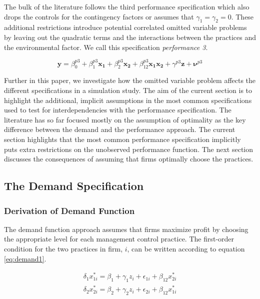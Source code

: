 \documentclass[12pt]{article}
\begin{document}
The bulk of the literature follows the third performance specification
which also drops the controls for the contingency factors or assumes
that \(\gamma_1 = \gamma_2 = 0\). These additional restrictions
introduce potential correlated omitted variable problems by leaving out
the quadratic terms and the interactions between the practices and the
environmental factor. We call this specification \emph{performance 3}.

\[
\mathbf{y} = \beta^{p3}_0 + \beta^{p3}_1 \mathbf{x_1} + \beta^{p3}_2 \mathbf{x_2}
  + \beta^{p3}_{12} \mathbf{x_1} \mathbf{x_2} + \gamma^{p3} \mathbf{z} +
  \mathbf{\nu}^{p3}
\]

Further in this paper, we investigate how the omitted variable problem
affects the different specifications in a simulation study. The aim of
the current section is to highlight the additional, implicit assumptions
in the most common specifications used to test for interdependencies
with the performance specification. The literature has so far focused
mostly on the assumption of optimality as the key difference between the
demand and the performance approach. The current section highlights that
the most common performance specification implicitly puts extra
restrictions on the unobserved performance function. The next section
discusses the consequences of assuming that firms optimally choose the
practices.

\subsection{The Demand Specification}\label{the-demand-specification}

\subsubsection{Derivation of Demand
Function}\label{derivation-of-demand-function}

The demand function approach assumes that firms maximize profit by
choosing the appropriate level for each management control practice. The
first-order condition for the two practices in firm, \(i\), can be
written according to equation \eqref{eq:demand1}.

\begin{align}\label{eq:demand1}
\delta_1 x^*_{1i} = \beta_1 + \gamma_1 z_i + \epsilon_{1i} + \beta_{12} x^*_{2i}
\\
\delta_2 x^*_{2i} = \beta_2 + \gamma_2 z_i + \epsilon_{2i} + \beta_{12} x^*_{1i}
\nonumber
\end{align}
\end{document}
